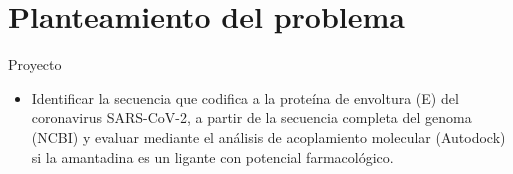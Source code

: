 \documentclass[9pt]{beamer}
\begin{document}
\section{Planteamiento del problema}
\begin{frame}{Proyecto}
   \begin{itemize}
   \item Identificar la secuencia que codifica a la proteína de envoltura (E) del coronavirus SARS-CoV-2, a partir de la secuencia completa del genoma (NCBI) y evaluar mediante el análisis de acoplamiento molecular (Autodock) si la amantadina es un ligante con potencial farmacológico. 
   
   
   \end{itemize}
 
\end{frame}
    
\end{document}
